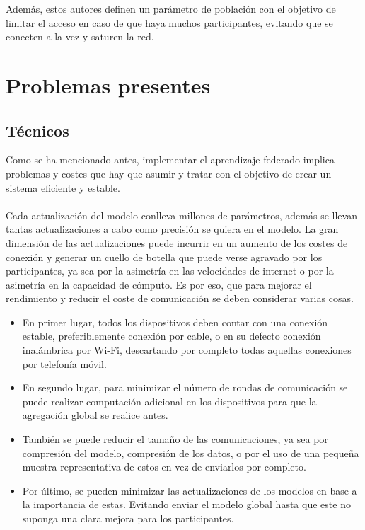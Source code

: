 Además, estos autores definen un parámetro de población con el objetivo de limitar el acceso en caso de que haya muchos participantes, evitando que se conecten a la vez y saturen la red.

\section{Problemas presentes}
\subsection{Técnicos}
Como se ha mencionado antes, implementar el aprendizaje federado implica problemas y costes que hay que asumir y tratar con el objetivo de crear un sistema eficiente y estable. 
\\ \\
Cada actualización del modelo conlleva millones de parámetros, además se llevan tantas actualizaciones a cabo como precisión se quiera en el modelo. La gran dimensión de las actualizaciones puede incurrir en un aumento de los costes de conexión y generar un cuello de botella que puede verse agravado por los participantes, ya sea por la asimetría en las velocidades de internet o por la asimetría en la capacidad de cómputo. Es por eso, que para mejorar el rendimiento y reducir el coste de comunicación se deben considerar varias cosas.
\begin{itemize}
    \item En primer lugar, todos los dispositivos deben contar con una conexión estable, preferiblemente conexión por cable, o en su defecto conexión inalámbrica por Wi-Fi, descartando por completo todas aquellas conexiones por telefonía móvil.
    \item En segundo lugar, para minimizar el número de rondas de comunicación se puede realizar computación adicional en los dispositivos para que la agregación global se realice antes.
    \item También se puede reducir el tamaño de las comunicaciones, ya sea por compresión del modelo, compresión de los datos, o por el uso de una pequeña muestra representativa de estos en vez de enviarlos por completo.
    \item Por último, se pueden minimizar las actualizaciones de los modelos en base a la importancia de estas. Evitando enviar el modelo global hasta que este no suponga una clara mejora para los participantes.
\end{itemize}

